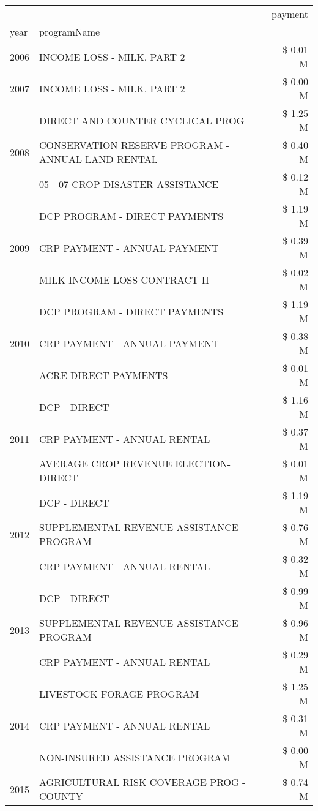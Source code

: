 \begin{tabular}{llr}
\toprule
 &  & payment \\
year & programName &  \\
\midrule
2006 & INCOME LOSS - MILK, PART 2 & \$ 0.01 M \\
\cline{1-3}
2007 & INCOME LOSS - MILK, PART 2 & \$ 0.00 M \\
\cline{1-3}
\multirow[t]{3}{*}{2008} & DIRECT AND COUNTER CYCLICAL PROG & \$ 1.25 M \\
 & CONSERVATION RESERVE PROGRAM - ANNUAL LAND RENTAL & \$ 0.40 M \\
 & 05 - 07 CROP DISASTER ASSISTANCE & \$ 0.12 M \\
\cline{1-3}
\multirow[t]{3}{*}{2009} & DCP PROGRAM - DIRECT PAYMENTS & \$ 1.19 M \\
 & CRP PAYMENT - ANNUAL PAYMENT & \$ 0.39 M \\
 & MILK INCOME LOSS CONTRACT II & \$ 0.02 M \\
\cline{1-3}
\multirow[t]{3}{*}{2010} & DCP PROGRAM - DIRECT PAYMENTS & \$ 1.19 M \\
 & CRP PAYMENT - ANNUAL PAYMENT & \$ 0.38 M \\
 & ACRE DIRECT PAYMENTS & \$ 0.01 M \\
\cline{1-3}
\multirow[t]{3}{*}{2011} & DCP - DIRECT & \$ 1.16 M \\
 & CRP PAYMENT - ANNUAL RENTAL & \$ 0.37 M \\
 & AVERAGE CROP REVENUE ELECTION-DIRECT & \$ 0.01 M \\
\cline{1-3}
\multirow[t]{3}{*}{2012} & DCP - DIRECT & \$ 1.19 M \\
 & SUPPLEMENTAL REVENUE ASSISTANCE PROGRAM & \$ 0.76 M \\
 & CRP PAYMENT - ANNUAL RENTAL & \$ 0.32 M \\
\cline{1-3}
\multirow[t]{3}{*}{2013} & DCP - DIRECT & \$ 0.99 M \\
 & SUPPLEMENTAL REVENUE ASSISTANCE PROGRAM & \$ 0.96 M \\
 & CRP PAYMENT - ANNUAL RENTAL & \$ 0.29 M \\
\cline{1-3}
\multirow[t]{3}{*}{2014} & LIVESTOCK FORAGE PROGRAM & \$ 1.25 M \\
 & CRP PAYMENT - ANNUAL RENTAL & \$ 0.31 M \\
 & NON-INSURED ASSISTANCE PROGRAM & \$ 0.00 M \\
\cline{1-3}
\multirow[t]{3}{*}{2015} & AGRICULTURAL RISK COVERAGE PROG - COUNTY & \$ 0.74 M \\

\end{tabular}
